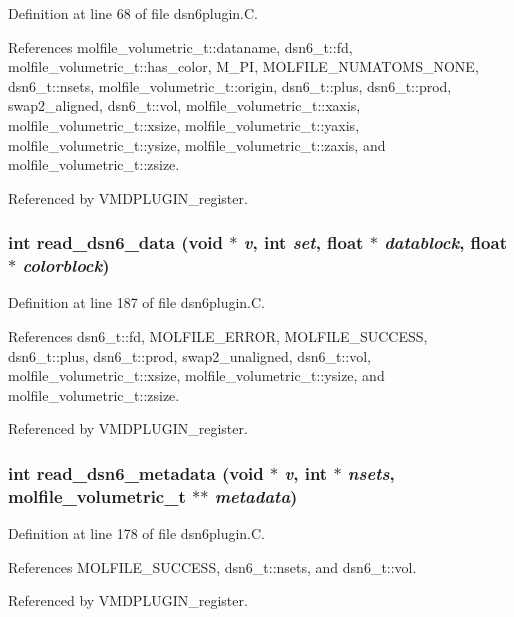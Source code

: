 Definition at line 68 of file dsn6plugin.C.

References molfile\_\-volumetric\_\-t::dataname, dsn6\_\-t::fd, molfile\_\-volumetric\_\-t::has\_\-color, M\_\-PI, MOLFILE\_\-NUMATOMS\_\-NONE, dsn6\_\-t::nsets, molfile\_\-volumetric\_\-t::origin, dsn6\_\-t::plus, dsn6\_\-t::prod, swap2\_\-aligned, dsn6\_\-t::vol, molfile\_\-volumetric\_\-t::xaxis, molfile\_\-volumetric\_\-t::xsize, molfile\_\-volumetric\_\-t::yaxis, molfile\_\-volumetric\_\-t::ysize, molfile\_\-volumetric\_\-t::zaxis, and molfile\_\-volumetric\_\-t::zsize.

Referenced by VMDPLUGIN\_\-register.
\subsubsection{\setlength{\rightskip}{0pt plus 5cm}int read\_\-dsn6\_\-data (void $\ast$ {\em v}, int {\em set}, float $\ast$ {\em datablock}, float $\ast$ {\em colorblock})\hspace{0.3cm}{\tt  [static]}}\label{dsn6plugin_8C_a4}




Definition at line 187 of file dsn6plugin.C.

References dsn6\_\-t::fd, MOLFILE\_\-ERROR, MOLFILE\_\-SUCCESS, dsn6\_\-t::plus, dsn6\_\-t::prod, swap2\_\-unaligned, dsn6\_\-t::vol, molfile\_\-volumetric\_\-t::xsize, molfile\_\-volumetric\_\-t::ysize, and molfile\_\-volumetric\_\-t::zsize.

Referenced by VMDPLUGIN\_\-register.
\subsubsection{\setlength{\rightskip}{0pt plus 5cm}int read\_\-dsn6\_\-metadata (void $\ast$ {\em v}, int $\ast$ {\em nsets}, {\bf molfile\_\-volumetric\_\-t} $\ast$$\ast$ {\em metadata})\hspace{0.3cm}{\tt  [static]}}\label{dsn6plugin_8C_a3}




Definition at line 178 of file dsn6plugin.C.

References MOLFILE\_\-SUCCESS, dsn6\_\-t::nsets, and dsn6\_\-t::vol.

Referenced by VMDPLUGIN\_\-register.

